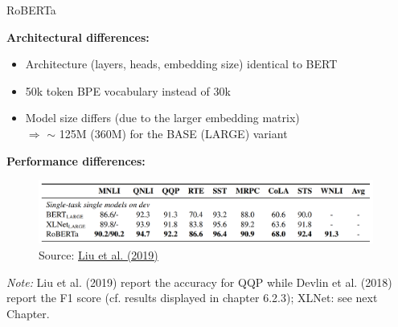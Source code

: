 \begin{frame}{RoBERTa \href{https://arxiv.org/pdf/1907.11692.pdf}{}}

\textbf{Architectural differences:}

\begin{itemize}
\item Architecture (layers, heads, embedding size) identical to BERT
\item 50k token BPE vocabulary instead of 30k
\item Model size differs (due to the larger embedding matrix)\\
			$\Rightarrow$ $\sim$ 125M (360M) for the BASE (LARGE) variant 
\end{itemize}

\textbf{Performance differences:}

\begin{figure}
\centering
\includegraphics[width = 11cm]{figure/roberta-sota.png}\\ 
\footnotesize{Source:} \href{https://arxiv.org/pdf/1907.11692.pdf}{\footnotesize Liu et al. (2019)}
\end{figure}
\footnotesize
\textit{Note:} Liu et al. (2019) report the accuracy for QQP while Devlin et al. (2018) report the F1 score (cf. results displayed in chapter 6.2.3); XLNet: see next Chapter.
\end{frame}

\endlecture

